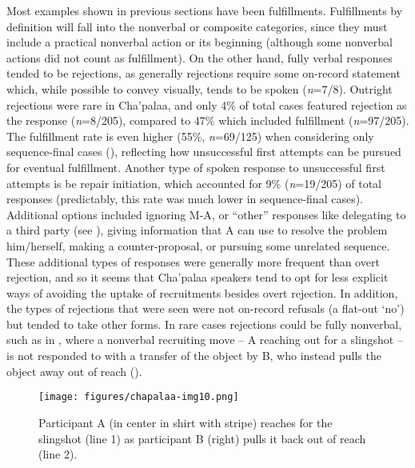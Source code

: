 \documentclass[output=paper]{langsci/langscibook}
\begin{document}
Most examples shown in previous sections have been fulfillments. Fulfillments by definition will fall into the nonverbal or composite categories, since they must include a practical nonverbal action or its beginning (although some nonverbal actions did not count as fulfillment). On the other hand, fully verbal responses tended to be rejections, as generally rejections require some on-record statement which, while possible to convey visually, tends to be spoken (\textit{n}=7/8). Outright rejections were rare in Cha'palaa, and only 4\% of total cases featured rejection as the response (\textit{n}=8/205), compared to 47\% which included fulfillment (\textit{n}=97/205). The fulfillment rate is even higher (55\%, \textit{n}=69/125) when considering only sequence-final cases (), reflecting how unsuccessful first attempts can be pursued for eventual fulfillment. Another type of spoken response to unsuccessful first attempts is be repair initiation, which accounted for 9\% (\textit{n}=19/205) of total responses (predictably, this rate was much lower in sequence-final cases). Additional options included ignoring M-A, or “other” responses like delegating to a third party (see ), giving information that A can use to resolve the problem him/herself, making a counter-proposal, or pursuing some unrelated sequence. These additional types of responses were generally more frequent than overt rejection, and so it seems that Cha'palaa speakers tend to opt for less explicit ways of avoiding the uptake of recruitments besides overt rejection. In addition, the types of rejections that were seen were not on-record refusals (a flat-out ‘no’) but tended to take other forms. In rare cases rejections could be fully nonverbal, such as in , where a nonverbal recruiting move -- A reaching out for a slingshot -- is not responded to with a transfer of the object by B, who instead pulls the object away out of reach ().

%
\begin{mdframednoverticalspace}[style=firstfoc]
\end{mdframednoverticalspace}
%
\begin{mdframednoverticalspace}[style=secondfoc]
\end{mdframednoverticalspace}

\begin{figure}
\texttt{[image: figures/chapalaa-img10.png]}
\caption{Participant A (in center in shirt with stripe) reaches for the slingshot (line 1) as participant B (right) pulls it back out of reach (line 2).}
\label{fig:floyd:8}
\end{figure}
\end{document}
